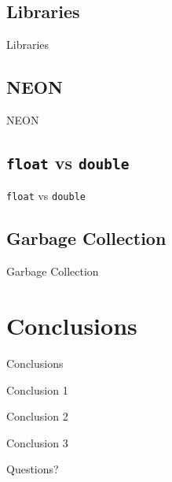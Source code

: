 \documentclass{beamer}
\begin{document}
\subsection{Libraries}
\begin{frame}{Libraries}
\end{frame}
\subsection{NEON}
\begin{frame}{NEON}
\end{frame}
\subsection{\texttt{float} vs \texttt{double}}
\begin{frame}{\texttt{float} vs \texttt{double}}
\end{frame}
\subsection{Garbage Collection}
\begin{frame}{Garbage Collection}
\end{frame}

\section{Conclusions}
\begin{frame}{Conclusions}
    \begin{block}{Conclusion 1}
        
    \end{block}
    \begin{block}{Conclusion 2}

    \end{block}
    \begin{block}{Conclusion 3}

    \end{block}
\end{frame}

%
%
%
%

\begin{frame}
\Huge{\centerline{Questions?}}
\end{frame}
\end{document}
